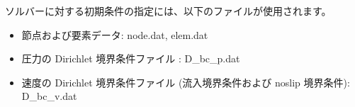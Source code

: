 \documentclass[8pt,a4paper]{article}
\begin{document}
ソルバーに対する初期条件の指定には、以下のファイルが使用されます。
\begin{itemize}
	\item 節点および要素データ: node.dat, elem.dat
	\item 圧力の Dirichlet 境界条件ファイル : D\_bc\_p.dat
	\item 速度の Dirichlet 境界条件ファイル (流入境界条件および noslip 境界条件): D\_bc\_v.dat
\end{itemize}


\end{document}
